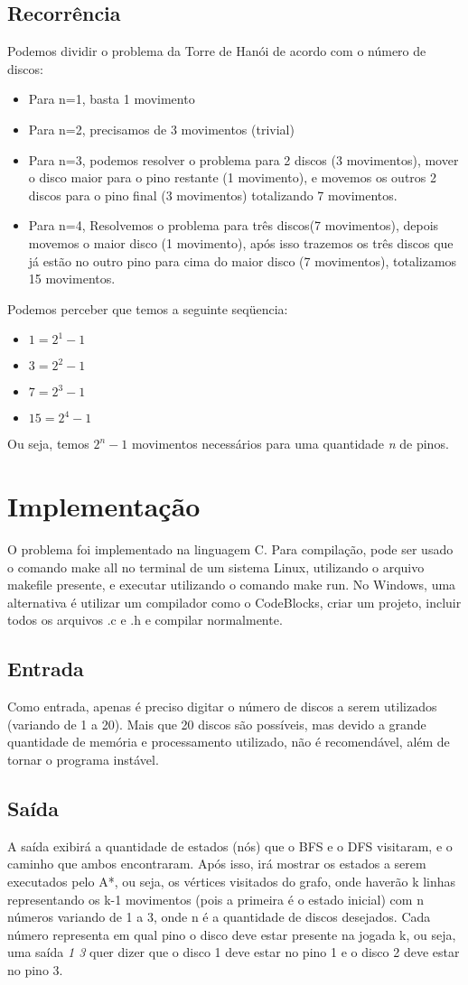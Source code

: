 \documentclass[10pt,a4paper]{article}
\begin{document}
\subsection{Recorrência}
Podemos dividir o problema da Torre de Hanói de acordo com o número de discos:
\begin{itemize}
\item Para n=1, basta 1 movimento
\item Para n=2, precisamos de 3 movimentos (trivial)
\item Para n=3, podemos resolver o problema para 2 discos (3 movimentos), mover o disco maior para o pino restante (1 movimento), e movemos os outros 2 discos para o pino final (3 movimentos) totalizando 7 movimentos.
\item Para n=4, Resolvemos o problema para três discos(7 movimentos), depois movemos o maior disco (1 movimento), após isso trazemos os três discos que já estão no outro pino para cima do maior disco (7 movimentos), totalizamos 15 movimentos.
\end{itemize}
Podemos perceber que temos a seguinte seqüencia:
\begin{itemize}
\item $1=2^1 -1$
\item $3=2^2 -1$
\item $7=2^3 -1$
\item $15=2^4 -1$
\end{itemize}
Ou seja, temos $2^n-1$ movimentos necessários para uma quantidade \textit{n} de pinos.

\section{Implementação}
O problema foi implementado na linguagem C. Para compilação, pode ser usado o comando make all no terminal de um sistema Linux, utilizando o arquivo makefile presente, e executar utilizando o comando make run. No Windows, uma alternativa é utilizar um compilador como o CodeBlocks, criar um projeto, incluir todos os arquivos .c e .h e compilar normalmente.
\subsection{Entrada}
Como entrada, apenas é preciso digitar o número de discos a serem utilizados (variando de 1 a 20). Mais que 20 discos são possíveis, mas devido a grande quantidade de memória e processamento utilizado, não é recomendável, além de tornar o programa instável.
\subsection{Saída}
A saída exibirá a quantidade de estados (nós) que o BFS e o DFS visitaram, e o caminho que ambos encontraram. Após isso, irá mostrar os estados a serem executados pelo A*, ou seja, os vértices visitados do grafo, onde haverão k linhas representando os k-1 movimentos (pois a primeira é o estado inicial) com n números variando de 1 a 3, onde n é a quantidade de discos desejados. Cada número representa em qual pino o disco deve estar presente na jogada k, ou seja, uma saída \textit{1 3} quer dizer que o disco 1 deve estar no pino 1 e o disco 2 deve estar no pino 3.
\end{document}
